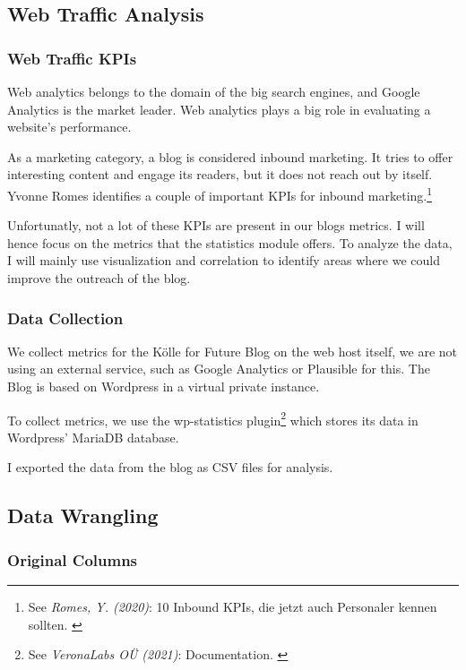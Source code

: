 \subsection{Web Traffic Analysis}

\subsubsection{Web Traffic KPIs}

Web analytics belongs to the domain of the big search engines, and Google Analytics is the market leader. Web analytics plays a big role in evaluating a website's performance.

As a marketing category, a blog is considered inbound marketing. It tries to offer interesting content and engage its readers, but it does not reach out by itself. Yvonne Romes identifies a couple of important KPIs for inbound marketing.\footnote{See \textit{Romes, Y. (2020)}: 10 Inbound KPIs, die jetzt auch Personaler kennen sollten. \cite{inboundKPI}}

Unfortunatly, not a lot of these KPIs are present in our blogs metrics. I will hence focus on the metrics that the statistics module offers. To analyze the data, I will mainly use visualization and correlation to identify areas where we could improve the outreach of the blog.

\subsubsection{Data Collection}

We collect metrics for the Kölle for Future Blog on the web host itself, we are not using an external service, such as Google Analytics or Plausible for this. The Blog is based on Wordpress in a virtual private instance.

To collect metrics, we use the wp-statistics plugin\footnote{See \textit{VeronaLabs OÜ (2021)}: Documentation. \cite{wpStatistics}} which stores its data in Wordpress' MariaDB database.

I exported the data from the blog as CSV files for analysis.

\subsection{Data Wrangling}

\subsubsection{Original Columns}

